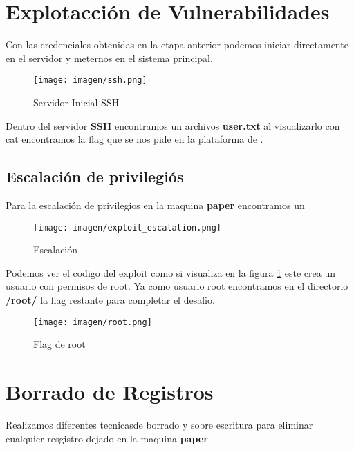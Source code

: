 \documentclass[a4paper]{article} %
\newcommand{\Maquina}{paper} %
\begin{document}
\section{Explotacción de Vulnerabilidades}

Con las credenciales obtenidas en la etapa anterior podemos iniciar directamente en el servidor y meternos en el sistema principal.
\vspace{0.5cm}
\begin{figure}[h]
    \centering
    \texttt{[image: imagen/ssh.png]}
    \caption{Servidor Inicial SSH}  
\end{figure}
\vspace{0.5cm} 

Dentro del servidor \textbf{SSH} encontramos un archivos \textbf{user.txt} al visualizarlo con cat encontramos la flag
que se nos pide en la plataforma de \href{https://hackthebox.eu}{\text}{\color {blue}{hackthebox}}.
\vspace{0.2cm}
\clearpage
\subsection{Escalación de privilegiós}
Para la escalación de privilegios en la maquina \textbf{\Maquina} encontramos un \href{https://github.com/Almorabea/Polkit-exploit/blob/main/CVE-2021-3560.py}{\textbf{\color{blue}{Exploit}}}
\begin{figure}[h]
    \centering
    \texttt{[image: imagen/exploit\_escalation.png]}
    \caption{Escalación}
    \label{fig:servicesResults}    
\end{figure}

\vspace{0.2cm}
Podemos ver el codigo del exploit como si visualiza en la figura \ref{fig:servicesResults} este crea un usuario
con permisos de root.
\clearpage
Ya como usuario root encontramos en el directorio \textbf{/root/} la flag restante para completar el desafio.
\begin{figure}[h]
    \centering
    \texttt{[image: imagen/root.png]}
    \caption{Flag de root}
    
\end{figure}

\section{Borrado de Registros}
Realizamos diferentes tecnicasde borrado y sobre escritura para eliminar cualquier resgistro
dejado en la maquina \textbf{\Maquina}.
\vspace{0.3cm}
\end{document}
